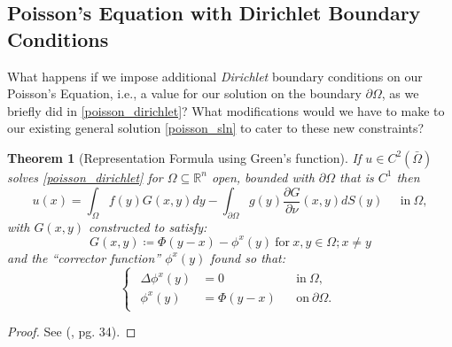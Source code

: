 \documentclass[openany, amssymb, psamsfonts]{amsart}
\newtheorem{thm}{Theorem}[section]
\theoremstyle{definition}
\numberwithin{equation}{section}
\newcommand{\bbr}{\mathbb{R}}
\begin{document}
\subsection{Poisson's Equation with Dirichlet Boundary Conditions} \label{sss_poisson_dirichlet}
What happens if we impose additional \textit{Dirichlet} boundary conditions on our Poisson's Equation, i.e., a value for our solution on the boundary $\partial \Omega$, as we briefly did in \eqref{poisson_dirichlet}? What modifications would we have to make to our existing general solution \eqref{poisson_sln} to cater to these new constraints?
\begin{thm} [Representation Formula using Green's function]
If $u \in C^2(\bar{\Omega})$ solves \eqref{poisson_dirichlet} for $\Omega \subseteq \bbr^n$ open, bounded with $\partial \Omega$ that is $C^1$ then \begin{equation} \label{poisson_dirichlet_sln}
    u(x) = \int_{\Omega} f(y) G(x, y) dy - \int_{\partial \Omega} g(y) \dfrac{\partial G}{\partial \nu}(x, y) dS(y)  \;\;\;\;\; \text{in}\: \Omega,
\end{equation}
with $G(x, y)$ constructed to satisfy:
\begin{equation} \label{green_construction}
    G(x, y) \coloneqq \Phi(y-x) - \phi^x(y) \:\text{for}\: x, y \in \Omega; x \neq y
\end{equation}
and the ``corrector function'' $\phi^x(y)$ found so that:
\begin{equation} \label{green_corrector}
    \begin{cases}
\begin{aligned}
    \Delta \phi^x (y) &= 0 &&\text{in}\: \Omega ,\\
    \phi^x (y) &= \Phi(y-x)  &&\text{on}\: \partial \Omega .
\end{aligned}
\end{cases}
\end{equation}
\end{thm}
\begin{proof}
See (\cite{Evans}, pg. 34).
\end{proof}
\end{document}
